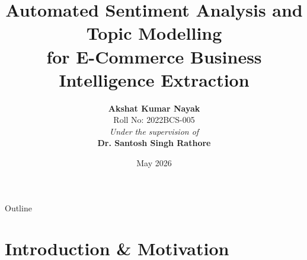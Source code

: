 \documentclass[aspectratio=169,xcolor=dvipsnames,10pt]{beamer}
\title[Sentiment Analysis \& BI Extraction]{Automated Sentiment Analysis and Topic Modelling\\for E-Commerce Business Intelligence Extraction}
\author[Akshat Kumar Nayak]{
    \textbf{Akshat Kumar Nayak} \\
    \vspace{0.1cm} Roll No: 2022BCS-005 \\
    \vspace{0.5cm}
    \small{\textit{Under the supervision of}} \\
    \textbf{Dr. Santosh Singh Rathore}
}
\institute{
    Department of Computer Science \& Engineering \\
    \vspace{0.2cm}
    \textit{B.Tech Project Presentation}
}
\date{May 2026}
\begin{document}
\begin{frame}
    \titlepage
\end{frame}

\begin{frame}{Outline}
    \tableofcontents
\end{frame}

\section{Introduction \& Motivation}
\end{document}
